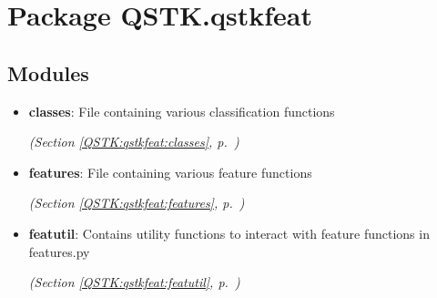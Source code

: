 %
%
%


\section{Package QSTK.qstkfeat}

    \label{QSTK:qstkfeat}


\subsection{Modules}

\begin{itemize}
\setlength{\parskip}{0ex}
\item \textbf{classes}: File containing various classification functions



  \textit{(Section \ref{QSTK:qstkfeat:classes}, p.~\pageref{QSTK:qstkfeat:classes})}

\item \textbf{features}: File containing various feature functions



  \textit{(Section \ref{QSTK:qstkfeat:features}, p.~\pageref{QSTK:qstkfeat:features})}

\item \textbf{featutil}: Contains utility functions to interact with feature functions in 
features.py



  \textit{(Section \ref{QSTK:qstkfeat:featutil}, p.~\pageref{QSTK:qstkfeat:featutil})}

\end{itemize}



